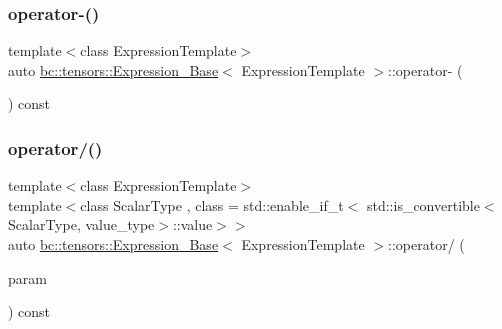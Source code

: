 \subsubsection{\texorpdfstring{operator-\/()}{operator-()}\hspace{0.1cm}{\footnotesize\ttfamily [3/3]}}
{\footnotesize\ttfamily template$<$class Expression\+Template$>$ \\
auto \hyperlink{classbc_1_1tensors_1_1Expression__Base}{bc\+::tensors\+::\+Expression\+\_\+\+Base}$<$ Expression\+Template $>$\+::operator-\/ (\begin{DoxyParamCaption}{ }\end{DoxyParamCaption}) const\hspace{0.3cm}{\ttfamily [inline]}}

\mbox{\label{classbc_1_1tensors_1_1Expression__Base_ac948776e4b1e6b24da25dc61ee1614a4}} 
\subsubsection{\texorpdfstring{operator/()}{operator/()}\hspace{0.1cm}{\footnotesize\ttfamily [1/2]}}
{\footnotesize\ttfamily template$<$class Expression\+Template$>$ \\
template$<$class Scalar\+Type , class  = std\+::enable\+\_\+if\+\_\+t$<$   std\+::is\+\_\+convertible$<$\+Scalar\+Type, value\+\_\+type$>$\+::value$>$$>$ \\
auto \hyperlink{classbc_1_1tensors_1_1Expression__Base}{bc\+::tensors\+::\+Expression\+\_\+\+Base}$<$ Expression\+Template $>$\+::operator/ (\begin{DoxyParamCaption}\item[{const Scalar\+Type \&}]{param }\end{DoxyParamCaption}) const\hspace{0.3cm}{\ttfamily [inline]}}

\mbox{\label{classbc_1_1tensors_1_1Expression__Base_aac23544543276824f91378096f4ca501}} 
